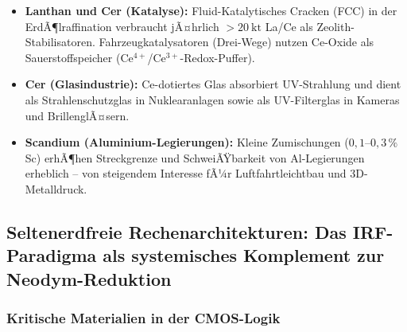﻿\documentclass[12pt, a4paper]{report}
\theoremstyle{definition}
\theoremstyle{remark}
\begin{document}
\begin{itemize}
  \item \textbf{Lanthan und Cer (Katalyse):} Fluid-Katalytisches Cracken (FCC)
        in der ErdÃ¶lraffination verbraucht jÃ¤hrlich $>\SI{20}{\kilo\tonne}$ La/Ce
        als Zeolith-Stabilisatoren. Fahrzeugkatalysatoren (Drei-Wege) nutzen
        Ce-Oxide als Sauerstoffspeicher (Ce$^{4+}$/Ce$^{3+}$-Redox-Puffer).
  \item \textbf{Cer (Glasindustrie):} Ce-dotiertes Glas absorbiert UV-Strahlung
        und dient als Strahlenschutzglas in Nuklearanlagen sowie als
        UV-Filterglas in Kameras und BrillenglÃ¤sern.
  \item \textbf{Scandium (Aluminium-Legierungen):} Kleine Zumischungen
        ($0{,}1$--$0{,}3\,\%$ Sc) erhÃ¶hen Streckgrenze und SchweiÃŸbarkeit
        von Al-Legierungen erheblich -- von steigendem Interesse fÃ¼r
        Luft\-fahrt\-leichtbau und 3D-Metalldruck.
\end{itemize}

\subsection{Seltenerdfreie Rechenarchitekturen: Das IRF-Paradigma als
            systemisches Komplement zur Neodym-Reduktion}
\label{ssec:irf_selteneerden}

\subsubsection{Kritische Materialien in der CMOS-Logik}
\end{document}
